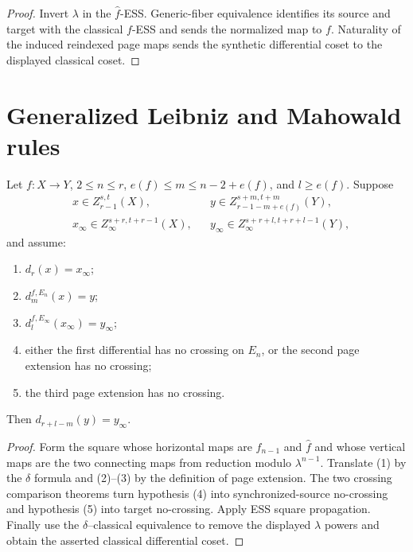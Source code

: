 \begin{proof}
  Invert $\lambda$ in the $\widehat f$-ESS.  Generic-fiber equivalence
  identifies its source and target with the classical $f$-ESS and sends the
  normalized map to $f$.  Naturality of the induced reindexed page maps sends
  the synthetic differential coset to the displayed classical coset.
\end{proof}

\section{Generalized Leibniz and Mahowald rules}

\begin{theorem}
  \label{thm:generalized-leibniz}
  \notready
  Let $f:X\to Y$, $2\le n\le r$,
  $e(f)\le m\le n-2+e(f)$, and $l\ge e(f)$.  Suppose
  \[
  \begin{aligned}
    &x\in Z_{r-1}^{s,t}(X),&&
    y\in Z_{r-1-m+e(f)}^{s+m,t+m}(Y),\\
    &x_\infty\in Z_\infty^{s+r,t+r-1}(X),&&
    y_\infty\in Z_\infty^{s+r+l,t+r+l-1}(Y),
  \end{aligned}
  \]
  and assume:
  \begin{enumerate}
    \item $d_r(x)=x_\infty$;
    \item $d_m^{f,E_n}(x)=y$;
    \item $d_l^{f,E_\infty}(x_\infty)=y_\infty$;
    \item either the first differential has no crossing on $E_n$, or the
      second page extension has no crossing;
    \item the third page extension has no crossing.
  \end{enumerate}
  Then $d_{r+l-m}(y)=y_\infty$.
\end{theorem}

\begin{proof}
  Form the square whose horizontal maps are
  $\widehat f_{n-1}$ and $\widehat f$ and whose vertical maps are the two
  connecting maps from reduction modulo $\lambda^{n-1}$.  Translate (1) by the
  $\delta$ formula and (2)--(3) by the definition of page extension.  The two
  crossing comparison theorems turn hypothesis (4) into synchronized-source
  no-crossing and hypothesis (5) into target no-crossing.  Apply ESS square
  propagation.  Finally use the $\delta$--classical equivalence to remove the
  displayed $\lambda$ powers and obtain the asserted classical differential
  coset.
\end{proof}

